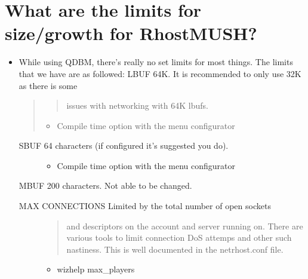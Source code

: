 \documentclass[letterpaper,10pt,english]{sphinxmanual}
\begin{document}
\section{What are the limits for size/growth for RhostMUSH?}
\label{\detokenize{12-advanced:what-are-the-limits-for-size-growth-for-rhostmush}}\begin{itemize}
\item {} 
\sphinxAtStartPar
While using QDBM, there’s really no set limits for most things.
The limits that we have are as followed:
LBUF \sphinxhyphen{} 64K.  It is recommended to only use 32K as there is some
\begin{quote}
\begin{quote}

\sphinxAtStartPar
issues with networking with 64K lbufs.
\end{quote}
\begin{itemize}
\item {} 
\sphinxAtStartPar
Compile time option with the menu configurator

\end{itemize}
\end{quote}
\begin{description}
\item[{SBUF \sphinxhyphen{} 64 characters (if configured \textendash{} it’s suggested you do).}] \leavevmode\begin{itemize}
\item {} 
\sphinxAtStartPar
Compile time option with the menu configurator

\end{itemize}

\end{description}

\sphinxAtStartPar
MBUF \sphinxhyphen{} 200 characters.  Not able to be changed.
\begin{description}
\item[{MAX CONNECTIONS \sphinxhyphen{} Limited by the total number of open sockets}] \leavevmode\begin{quote}

\sphinxAtStartPar
and descriptors on the account and server running on.
There are various tools to limit connection DoS attemps
and other such nastiness.  This is well documented in
the netrhost.conf file.
\end{quote}
\begin{itemize}
\item {} 
\sphinxAtStartPar
wizhelp max\_players


\end{itemize}
\end{description}
\end{itemize}
\end{document}
